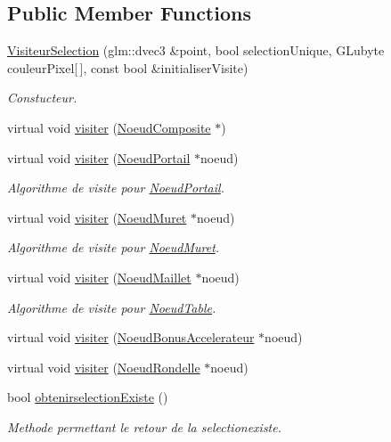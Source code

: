 \subsection*{Public Member Functions}
\begin{DoxyCompactItemize}
\item 
\hypertarget{class_visiteur_selection_abfa92ff155e59d64ab79d2f6530715ff}{}\label{class_visiteur_selection_abfa92ff155e59d64ab79d2f6530715ff} 
\hyperlink{class_visiteur_selection_abfa92ff155e59d64ab79d2f6530715ff}{Visiteur\+Selection} (glm\+::dvec3 \&point, bool selection\+Unique, G\+Lubyte couleur\+Pixel\mbox{[}$\,$\mbox{]}, const bool \&initialiser\+Visite)
\begin{DoxyCompactList}\small\item\em Constucteur. \end{DoxyCompactList}\item 
virtual void \hyperlink{group__inf2990_gaf6d77b8c875bda7f01434cf4e834599c}{visiter} (\hyperlink{class_noeud_composite}{Noeud\+Composite} $\ast$)
\item 
virtual void \hyperlink{group__inf2990_ga5576bd68b32506507c788027a8804cff}{visiter} (\hyperlink{class_noeud_portail}{Noeud\+Portail} $\ast$noeud)
\begin{DoxyCompactList}\small\item\em Algorithme de visite pour \hyperlink{class_noeud_portail}{Noeud\+Portail}. \end{DoxyCompactList}\item 
virtual void \hyperlink{group__inf2990_ga91d77668ef5dad7e42a9d9876d7464da}{visiter} (\hyperlink{class_noeud_muret}{Noeud\+Muret} $\ast$noeud)
\begin{DoxyCompactList}\small\item\em Algorithme de visite pour \hyperlink{class_noeud_muret}{Noeud\+Muret}. \end{DoxyCompactList}\item 
virtual void \hyperlink{group__inf2990_ga6b291b464d019af9696d2916ae58dc23}{visiter} (\hyperlink{class_noeud_maillet}{Noeud\+Maillet} $\ast$noeud)
\begin{DoxyCompactList}\small\item\em Algorithme de visite pour \hyperlink{class_noeud_table}{Noeud\+Table}. \end{DoxyCompactList}\item 
virtual void \hyperlink{group__inf2990_gaa00c8b4c2a981faf4b6bd5ecdafc3427}{visiter} (\hyperlink{class_noeud_bonus_accelerateur}{Noeud\+Bonus\+Accelerateur} $\ast$noeud)
\item 
virtual void \hyperlink{group__inf2990_ga81f3ec46afbfe7fdbc5a3406991e00b7}{visiter} (\hyperlink{class_noeud_rondelle}{Noeud\+Rondelle} $\ast$noeud)
\item 
\hypertarget{class_visiteur_selection_aa2882688ed42325b7ecf6b17be4fcc72}{}\label{class_visiteur_selection_aa2882688ed42325b7ecf6b17be4fcc72} 
bool \hyperlink{class_visiteur_selection_aa2882688ed42325b7ecf6b17be4fcc72}{obtenirselection\+Existe} ()
\begin{DoxyCompactList}\small\item\em Methode permettant le retour de la selectionexiste. \end{DoxyCompactList}\end{DoxyCompactItemize}

